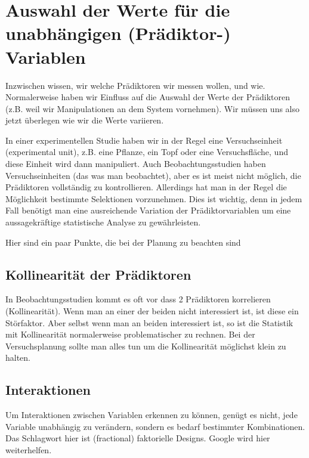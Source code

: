 \documentclass[a4paper,twoside]{tufte-book}\usepackage[]{graphicx}\usepackage[]{color}
\begin{document}
\section{Auswahl der Werte für die unabhängigen (Prädiktor-) Variablen}

Inzwischen wissen, wir welche Prädiktoren wir messen wollen, und wie. Normalerweise haben wir Einfluss auf die Auswahl der Werte der Prädiktoren (z.B. weil wir Manipulationen an dem System vornehmen). Wir müssen uns also jetzt überlegen wie wir die Werte variieren. 

In einer experimentellen Studie haben wir in der Regel eine Versuchseinheit (experimental unit), z.B. eine Pflanze, ein Topf oder eine Versuchsfläche, und diese Einheit wird dann manipuliert. Auch Beobachtungsstudien haben Versuchseinheiten (das was man beobachtet), aber es ist meist nicht möglich, die Prädiktoren vollständig zu kontrollieren. Allerdings hat man in der Regel die Möglichkeit bestimmte Selektionen vorzunehmen. Dies ist wichtig, denn in jedem Fall benötigt man eine ausreichende Variation der Prädiktorvariablen um eine aussagekräftige statistische Analyse zu gewährleisten.

Hier sind ein paar Punkte, die bei der Planung zu beachten sind

\subsection{Kollinearität der Prädiktoren}

In Beobachtungsstudien kommt es oft vor dass 2 Prädiktoren korrelieren (Kollinearität). Wenn man an einer der beiden nicht interessiert ist, ist diese ein Störfaktor. Aber selbst wenn man an beiden interessiert ist, so ist die Statistik mit Kollinearität normalerweise problematischer zu rechnen. Bei der Versuchsplanung sollte man alles tun um die Kollinearität möglichst klein zu halten. 

\subsection{Interaktionen}

Um Interaktionen zwischen Variablen erkennen zu können, genügt es nicht, jede Variable unabhängig zu verändern, sondern es bedarf bestimmter Kombinationen. Das Schlagwort hier ist (fractional) faktorielle Designs. Google wird hier weiterhelfen.
\end{document}
